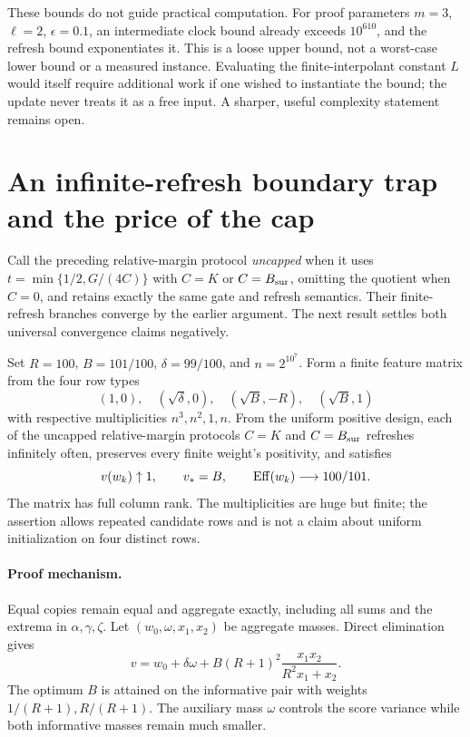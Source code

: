 \documentclass[11pt]{article}
\begin{document}
These bounds do not guide practical computation. For proof parameters $m=3$, $\ell=2$, $\epsilon=0.1$, an intermediate clock bound already exceeds $10^{610}$, and the refresh bound exponentiates it. This is a loose upper bound, not a worst-case lower bound or a measured instance. Evaluating the finite-interpolant constant $L$ would itself require additional work if one wished to instantiate the bound; the update never treats it as a free input. A sharper, useful complexity statement remains open.


\section{An infinite-refresh boundary trap and the price of the cap}
Call the preceding relative-margin protocol \emph{uncapped} when it uses
$t=\min\{1/2,G/(4C)\}$ with $C=K$ or $C=B_{\rm sur}$, omitting the quotient when $C=0$, and retains exactly the same gate and refresh semantics. Their finite-refresh branches converge by the earlier argument. The next result settles both universal convergence claims negatively.

\begin{theorem}\label{thm:infinite-trap}
Set $R=100$, $B=101/100$, $\delta=99/100$, and $n=2^{10^7}$. Form a finite feature matrix from the four row types
\[
 (1,0),\quad(\sqrt{\delta},0),\quad(\sqrt B,-R),\quad(\sqrt B,1)
\]
with respective multiplicities $n^3,n^2,1,n$. From the uniform positive design, each of the uncapped relative-margin protocols $C=K$ and $C=B_{\rm sur}$ refreshes infinitely often, preserves every finite weight's positivity, and satisfies
\[
 v(w_k)\uparrow1,\qquad v_*=B,\qquad \operatorname{Eff}(w_k)\longrightarrow100/101.
\]
The matrix has full column rank. The multiplicities are huge but finite; the assertion allows repeated candidate rows and is not a claim about uniform initialization on four distinct rows.
\end{theorem}

\paragraph{Proof mechanism.}
Equal copies remain equal and aggregate exactly, including all sums and the extrema in $\alpha,\gamma,\zeta$. Let $(w_0,\omega,x_1,x_2)$ be aggregate masses. Direct elimination gives
\[
 v=w_0+\delta\omega+
 B(R+1)^2\frac{x_1x_2}{R^2x_1+x_2}.
\]
The optimum $B$ is attained on the informative pair with weights $1/(R+1),R/(R+1)$. The auxiliary mass $\omega$ controls the score variance while both informative masses remain much smaller.
\end{document}
